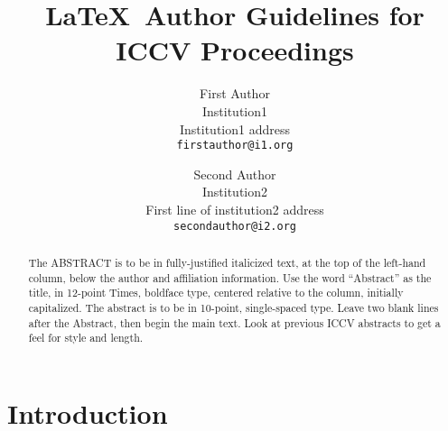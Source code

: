 \documentclass[10pt,twocolumn,letterpaper]{article}
\begin{document}
\title{\LaTeX\ Author Guidelines for ICCV Proceedings}

\author{First Author\\
Institution1\\
Institution1 address\\
{\tt\small firstauthor@i1.org}
\and
Second Author\\
Institution2\\
First line of institution2 address\\
{\tt\small secondauthor@i2.org}
}

\maketitle


\begin{abstract}
   The ABSTRACT is to be in fully-justified italicized text, at the top
   of the left-hand column, below the author and affiliation
   information. Use the word ``Abstract'' as the title, in 12-point
   Times, boldface type, centered relative to the column, initially
   capitalized. The abstract is to be in 10-point, single-spaced type.
   Leave two blank lines after the Abstract, then begin the main text.
   Look at previous ICCV abstracts to get a feel for style and length.
\end{abstract}

\section{Introduction}
\end{document}
